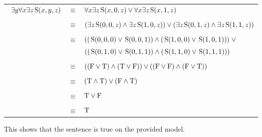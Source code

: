 \documentclass{article}
\newcommand{\True}{\textnormal{T}}
\newcommand{\False}{\textnormal{F}}
\newcommand{\predS}{\hspace{0.05cm} \textnormal{S}}
\newcommand{\predicate}{\predS (x,y,z)}
\begin{document}
\begin{enumerate}
{\begin{center}
    $ $
    \end{center}
    }
    {
    \begin{center}\begin{tabular}{ccl}\
   $\exists y \forall x \exists z \predicate$ & $\equiv$ & $\forall x \exists z \predS(x,0,z) \lor \forall x \exists z \predS(x,1,z)$ \\ \\
    
    & $\equiv$ & $(\exists z \predS(0,0,z) \land \exists z \predS(1,0,z)) \lor (\exists z \predS(0,1,z) \land \exists z \predS(1,1,z))$ \\ \\
    
    & $\equiv$ & $((\predS(0,0,0) \lor \predS(0,0,1)) \land (\predS(1,0,0) \lor \predS(1,0,1))) \hspace{0.1cm} \lor$ \\
    & & $((\predS(0,1,0) \lor \predS(0,1,1)) \land (\predS(1,1,0) \lor \predS(1,1,1)))$ \\ \\
    
    & $\equiv$ & $((\False \lor \True) \land (\True \lor \False)) \lor ((\False \lor \False) \land (\False \lor \True))$ \\ \\
    
    & $\equiv$ & $(\True \land \True) \lor (\False \land \True)$ \\ \\
    
    & $\equiv$ & $\True \lor \False$ \\ \\
    
    & $\equiv$ & $\True$ \\ 
    \end{tabular}\end{center}
    This shows that the sentence is true on the provided model.
    }

    \pagebreak


\end{enumerate}
\end{document}

